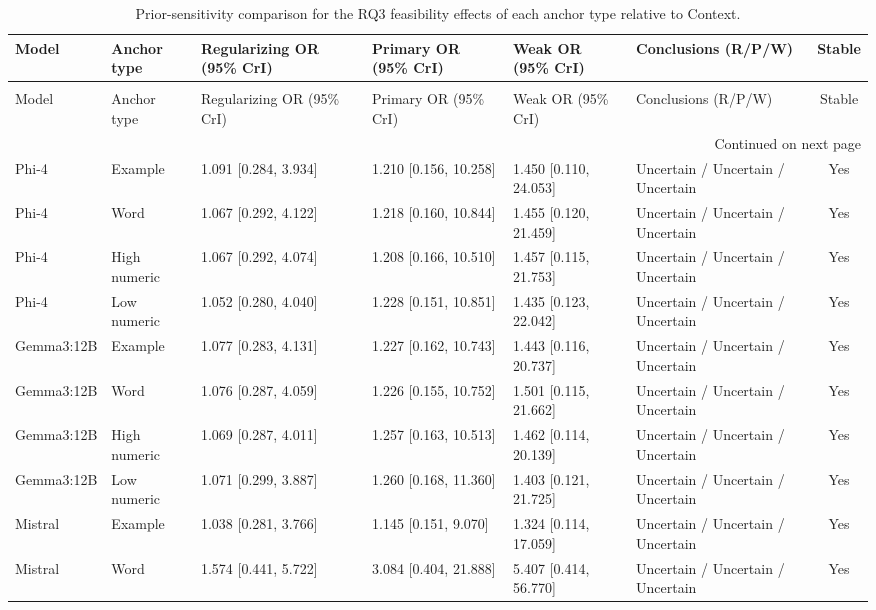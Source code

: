 \begin{longtable}[tbp]{p{2.0cm}p{2.2cm}p{3.1cm}p{3.1cm}p{3.1cm}p{3.7cm}c}
\caption{Prior-sensitivity comparison for the RQ3 feasibility effects of each anchor type relative to Context.} \label{tab:rq3_feasibility_prior_sensitivity} \\
\toprule
Model & Anchor type & Regularizing OR (95\% CrI) & Primary OR (95\% CrI) & Weak OR (95\% CrI) & Conclusions (R/P/W) & Stable \\
\midrule
\endfirsthead
\caption[]{Prior-sensitivity comparison for the RQ3 feasibility effects of each anchor type relative to Context.} \\
\toprule
Model & Anchor type & Regularizing OR (95\% CrI) & Primary OR (95\% CrI) & Weak OR (95\% CrI) & Conclusions (R/P/W) & Stable \\
\midrule
\endhead
\midrule
\multicolumn{7}{r}{Continued on next page} \\
\midrule
\endfoot
\bottomrule
\endlastfoot
Phi-4 & Example & 1.091 [0.284, 3.934] & 1.210 [0.156, 10.258] & 1.450 [0.110, 24.053] & Uncertain / Uncertain / Uncertain & Yes \\
Phi-4 & Word & 1.067 [0.292, 4.122] & 1.218 [0.160, 10.844] & 1.455 [0.120, 21.459] & Uncertain / Uncertain / Uncertain & Yes \\
Phi-4 & High numeric & 1.067 [0.292, 4.074] & 1.208 [0.166, 10.510] & 1.457 [0.115, 21.753] & Uncertain / Uncertain / Uncertain & Yes \\
Phi-4 & Low numeric & 1.052 [0.280, 4.040] & 1.228 [0.151, 10.851] & 1.435 [0.123, 22.042] & Uncertain / Uncertain / Uncertain & Yes \\
Gemma3:12B & Example & 1.077 [0.283, 4.131] & 1.227 [0.162, 10.743] & 1.443 [0.116, 20.737] & Uncertain / Uncertain / Uncertain & Yes \\
Gemma3:12B & Word & 1.076 [0.287, 4.059] & 1.226 [0.155, 10.752] & 1.501 [0.115, 21.662] & Uncertain / Uncertain / Uncertain & Yes \\
Gemma3:12B & High numeric & 1.069 [0.287, 4.011] & 1.257 [0.163, 10.513] & 1.462 [0.114, 20.139] & Uncertain / Uncertain / Uncertain & Yes \\
Gemma3:12B & Low numeric & 1.071 [0.299, 3.887] & 1.260 [0.168, 11.360] & 1.403 [0.121, 21.725] & Uncertain / Uncertain / Uncertain & Yes \\
Mistral & Example & 1.038 [0.281, 3.766] & 1.145 [0.151, 9.070] & 1.324 [0.114, 17.059] & Uncertain / Uncertain / Uncertain & Yes \\
Mistral & Word & 1.574 [0.441, 5.722] & 3.084 [0.404, 21.888] & 5.407 [0.414, 56.770] & Uncertain / Uncertain / Uncertain & Yes \\

\end{longtable}
